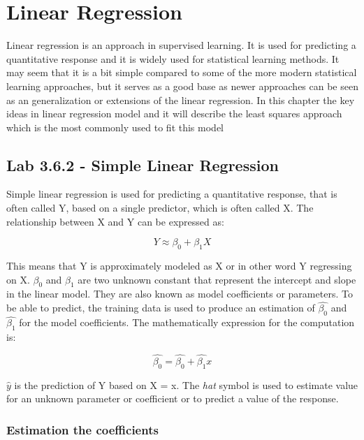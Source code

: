 \chapter{Linear Regression}
\label{chp:linreg}

Linear regression is an approach in supervised learning. It is used for predicting a quantitative response and it is widely used for statistical learning methods. It may seem that it is a bit simple compared to some of the more modern statistical learning approaches, but it serves as a good base as newer approaches can be seen as an generalization or extensions of the linear regression. 
In this chapter the key ideas in linear regression model and it will describe the least squares approach
which is the most commonly used to fit this model

\section{Lab 3.6.2 - Simple Linear Regression}

Simple linear regression is used for predicting a quantitative response, that is often called Y, based on a single predictor, which is often called X.
The relationship between X and Y can be expressed as:

\begin{equation}
	Y \approx \beta_0 + \beta_1X
\end{equation}

This means that Y is approximately modeled as X or in other word Y regressing on X. 
$\beta_0$ and $\beta_1$ are two unknown constant that represent the intercept and slope in the linear model. They are also known as model coefficients or parameters. 
To be able to predict, the training data is used to produce
an estimation of $\hat{\beta_0}$ and $\hat{\beta_1}$ for the model coefficients. 
The mathematically expression for the computation is:

\begin{equation}
	\hat{\beta_0} = \hat{\beta_0} + \hat{\beta_1}x
\end{equation}


$\hat{y}$ is the prediction of Y based on X = x. The \textit{hat} symbol is used to estimate value for an unknown parameter or coefficient or to predict a value of the response.

\subsection{Estimation the coefficients}


